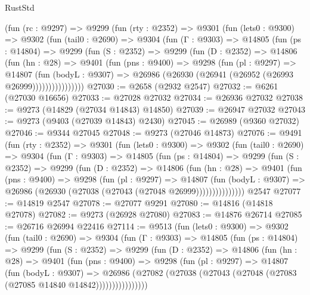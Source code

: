 \begin{lexlean}{RustStd}
\begin{coremodule}
{\begin{coremodule}
{{{{{{{{{{{{{{{{{{{{{{{{{{{{{{{{{{{{{{{{{{{{{{{{{{{{{{{    (fun (rc : @9297) =>
    @9299
      (fun (rty : @2352) =>
      @9301
        (fun (lets0 : @9300) =>
        @9302
          (fun (tail0 : @2690) =>
          @9304
            (fun (Γ : @9303) =>
            @14805
              (fun (ps : @14804) =>
              @9299
                (fun (S : @2352) =>
                @9299
                  (fun (D : @2352) =>
                  @14806
                    (fun (hn : @28) =>
                    @9401
                      (fun (pns : @9400) =>
                      @9298
                        (fun (pl : @9297) =>
                        @14807
                          (fun (bodyL : @9307) =>
                          @26986 (@26930 (@26941 (@26952 (@26993 @26999))))))))))))))))
@27030 := @2658 (@2932 @2547)
@27032 := @6261 (@27030 @16656)
@27033 := @27028 @27032
@27034 := @26936 @27032
@27038 := @9273 (@14829 (@27034 @14843) @14850)
@27039 := @26947 @27032
@27043 := @9273 (@9403 (@27039 @14843) @2430)
@27045 := @26989 (@9360 @27032)
@27046 := @9344 @27045
@27048 := @9273 (@27046 @14873)
@27076 := @9491
    (fun (rty : @2352) =>
    @9301
      (fun (lets0 : @9300) =>
      @9302
        (fun (tail0 : @2690) =>
        @9304
          (fun (Γ : @9303) =>
          @14805
            (fun (ps : @14804) =>
            @9299
              (fun (S : @2352) =>
              @9299
                (fun (D : @2352) =>
                @14806
                  (fun (hn : @28) =>
                  @9401
                    (fun (pns : @9400) =>
                    @9298
                      (fun (pl : @9297) =>
                      @14807
                        (fun (bodyL : @9307) =>
                        @26986 (@26930 (@27038 (@27043 (@27048 @26999)))))))))))))))
    @2547
@27077 := @14819 @2547
@27078 := @27077 @9291
@27080 := @14816 (@14818 @27078)
@27082 := @9273 (@26928 @27080)
@27083 := @14876 @26714
@27085 := @26716 @26994 @22416
@27114 := @9513
    (fun (lets0 : @9300) =>
    @9302
      (fun (tail0 : @2690) =>
      @9304
        (fun (Γ : @9303) =>
        @14805
          (fun (ps : @14804) =>
          @9299
            (fun (S : @2352) =>
            @9299
              (fun (D : @2352) =>
              @14806
                (fun (hn : @28) =>
                @9401
                  (fun (pns : @9400) =>
                  @9298
                    (fun (pl : @9297) =>
                    @14807
                      (fun (bodyL : @9307) =>
                      @26986
                        (@27082
                          (@27038 (@27043 (@27048 (@27083 (@27085 @14840 @14842))))))))))))))))
}}}}}}}}}}}}}}}}}}}}}}}}}}}}}}}}}}}}}}}}}}}}}}}}}}}}}}}
\end{coremodule}}
\end{coremodule}
\end{lexlean}
